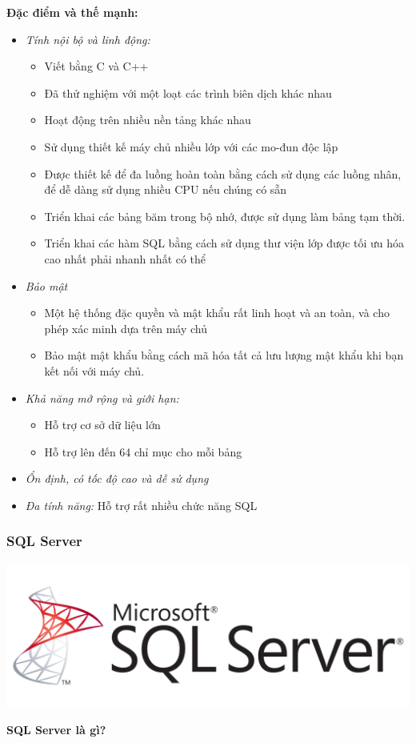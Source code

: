 \textbf{Đặc điểm và thế mạnh:}
\begin{itemize}
    \item \textit{Tính nội bộ và linh động:}
    \begin{itemize}
    \item Viết bằng C và C++
    \item Đã thử nghiệm với một loạt các trình biên dịch khác nhau
    \item Hoạt động trên nhiều nền tảng khác nhau
    \item Sử dụng thiết kế máy chủ nhiều lớp với các mo-đun độc lập
    \item Được thiết kế để đa luồng hoàn toàn bằng cách sử dụng các luồng nhân, để dễ dàng sử dụng nhiều CPU nếu chúng có sẵn
    \item Triển khai các bảng băm trong bộ nhớ, được sử dụng làm bảng tạm thời.
    \item Triển khai các hàm SQL bằng cách sử dụng thư viện lớp được tối ưu hóa cao nhất phải nhanh nhất có thể
    \end{itemize}
    \item \textit{Bảo mật}
    \begin{itemize}
        \item Một hệ thống đặc quyền và mật khẩu rất linh hoạt và an toàn, và cho phép xác minh dựa trên máy chủ
        \item Bảo mật mật khẩu bằng cách mã hóa tất cả lưu lượng mật khẩu khi bạn kết nối với máy chủ.
    \end{itemize}
    \item \textit{Khả năng mở rộng và giới hạn:}
    \begin{itemize}
        \item Hỗ trợ cơ sở dữ liệu lớn
        \item Hỗ trợ lên đến 64 chỉ mục cho mỗi bảng
    \end{itemize}
    \item \textit{Ổn định, có tốc độ cao và dễ sử dụng}
    \item \textit{Đa tính năng:} Hỗ trợ rất nhiều chức năng SQL
\end{itemize}
\subsubsection{SQL Server}
\begin{center}
  \captionsetup{type=figure}
    \includegraphics[scale=0.3]{image/sql-server.png}
\end{center}
\textbf{SQL Server là gì?}

